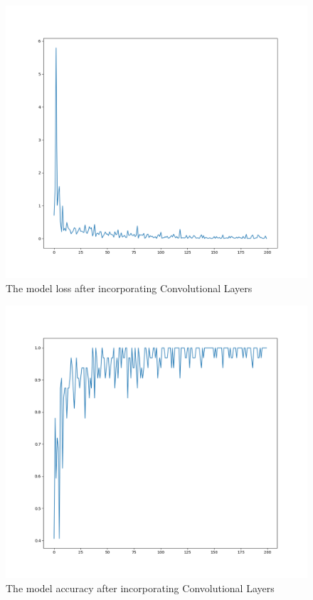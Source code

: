\begin{figure}[H]
	\centering
	\includegraphics[width = 5.5in]{images/metrics.png}
	\caption{The model loss after incorporating Convolutional Layers}
\label{good_metrics}
\end{figure}


\begin{figure}[H]
	\centering
	\includegraphics[width = 5.5in]{images/goodacc.png}
	\caption{The model accuracy after incorporating Convolutional Layers}
\label{good_metrics2}
\end{figure}

